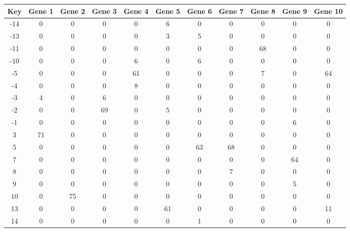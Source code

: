 \begin{tabular}{|c|c|c|c|c|c|c|c|c|c|c|}
\hline
Key & Gene 1 & Gene 2 & Gene 3 & Gene 4 & Gene 5 & Gene 6 & Gene 7 & Gene 8 & Gene 9 & Gene 10 \\
\hline
-14 & 0 & 0 & 0 & 0 & 6 & 0 & 0 & 0 & 0 & 0 \\
-13 & 0 & 0 & 0 & 0 & 3 & 5 & 0 & 0 & 0 & 0 \\
-11 & 0 & 0 & 0 & 0 & 0 & 0 & 0 & 68 & 0 & 0 \\
-10 & 0 & 0 & 0 & 6 & 0 & 6 & 0 & 0 & 0 & 0 \\
-5 & 0 & 0 & 0 & 61 & 0 & 0 & 0 & 7 & 0 & 64 \\
-4 & 0 & 0 & 0 & 8 & 0 & 0 & 0 & 0 & 0 & 0 \\
-3 & 4 & 0 & 6 & 0 & 0 & 0 & 0 & 0 & 0 & 0 \\
-2 & 0 & 0 & 69 & 0 & 5 & 0 & 0 & 0 & 0 & 0 \\
-1 & 0 & 0 & 0 & 0 & 0 & 0 & 0 & 0 & 6 & 0 \\
3 & 71 & 0 & 0 & 0 & 0 & 0 & 0 & 0 & 0 & 0 \\
5 & 0 & 0 & 0 & 0 & 0 & 63 & 68 & 0 & 0 & 0 \\
7 & 0 & 0 & 0 & 0 & 0 & 0 & 0 & 0 & 64 & 0 \\
8 & 0 & 0 & 0 & 0 & 0 & 0 & 7 & 0 & 0 & 0 \\
9 & 0 & 0 & 0 & 0 & 0 & 0 & 0 & 0 & 5 & 0 \\
10 & 0 & 75 & 0 & 0 & 0 & 0 & 0 & 0 & 0 & 0 \\
13 & 0 & 0 & 0 & 0 & 61 & 0 & 0 & 0 & 0 & 11 \\
14 & 0 & 0 & 0 & 0 & 0 & 1 & 0 & 0 & 0 & 0 \\
\hline
\end{tabular}